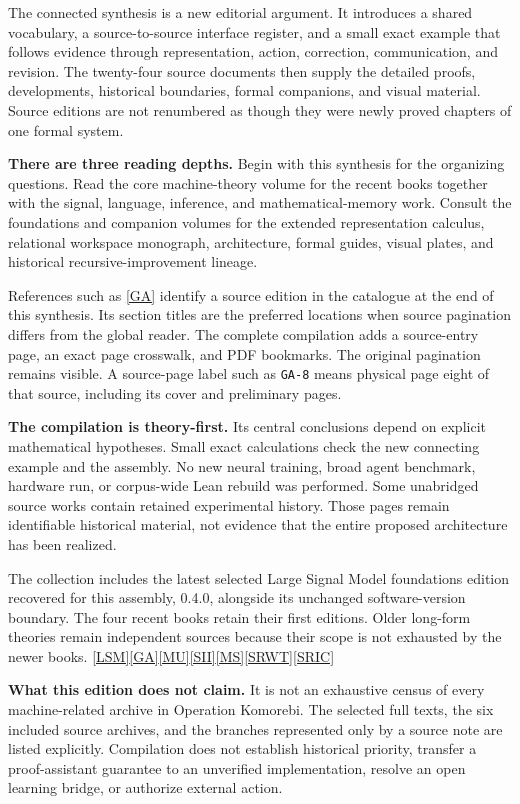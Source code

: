 \documentclass[11pt,oneside]{article}
\newcommand{\src}[1]{\hyperlink{cat:#1}{\textsf{[#1]}}}
\begin{document}
The connected synthesis is a new editorial argument. It introduces a shared vocabulary, a source-to-source interface register, and a small exact example that follows evidence through representation, action, correction, communication, and revision. The twenty-four source documents then supply the detailed proofs, developments, historical boundaries, formal companions, and visual material. Source editions are not renumbered as though they were newly proved chapters of one formal system.

\textbf{There are three reading depths.} Begin with this synthesis for the organizing questions. Read the core machine-theory volume for the recent books together with the signal, language, inference, and mathematical-memory work. Consult the foundations and companion volumes for the extended representation calculus, relational workspace monograph, architecture, formal guides, visual plates, and historical recursive-improvement lineage.

References such as \src{GA} identify a source edition in the catalogue at the end of this synthesis. Its section titles are the preferred locations when source pagination differs from the global reader. The complete compilation adds a source-entry page, an exact page crosswalk, and PDF bookmarks. The original pagination remains visible. A source-page label such as \texttt{GA-8} means physical page eight of that source, including its cover and preliminary pages.

\textbf{The compilation is theory-first.} Its central conclusions depend on explicit mathematical hypotheses. Small exact calculations check the new connecting example and the assembly. No new neural training, broad agent benchmark, hardware run, or corpus-wide Lean rebuild was performed. Some unabridged source works contain retained experimental history. Those pages remain identifiable historical material, not evidence that the entire proposed architecture has been realized.

The collection includes the latest selected Large Signal Model foundations edition recovered for this assembly, 0.4.0, alongside its unchanged software-version boundary. The four recent books retain their first editions. Older long-form theories remain independent sources because their scope is not exhausted by the newer books. \src{LSM}\src{GA}\src{MU}\src{SII}\src{MS}\src{SRWT}\src{SRIC}

\textbf{What this edition does not claim.} It is not an exhaustive census of every machine-related archive in Operation Komorebi. The selected full texts, the six included source archives, and the branches represented only by a source note are listed explicitly. Compilation does not establish historical priority, transfer a proof-assistant guarantee to an unverified implementation, resolve an open learning bridge, or authorize external action.
\end{document}

